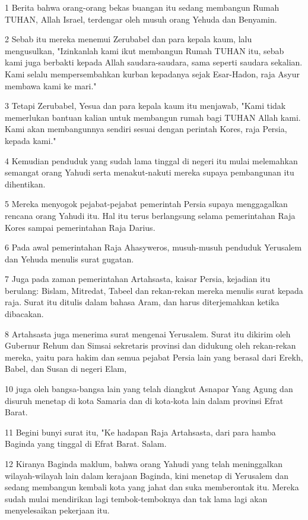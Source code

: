 \par 1 Berita bahwa orang-orang bekas buangan itu sedang membangun Rumah TUHAN, Allah Israel, terdengar oleh musuh orang Yehuda dan Benyamin.
\par 2 Sebab itu mereka menemui Zerubabel dan para kepala kaum, lalu mengusulkan, "Izinkanlah kami ikut membangun Rumah TUHAN itu, sebab kami juga berbakti kepada Allah saudara-saudara, sama seperti saudara sekalian. Kami selalu mempersembahkan kurban kepadanya sejak Esar-Hadon, raja Asyur membawa kami ke mari."
\par 3 Tetapi Zerubabel, Yesua dan para kepala kaum itu menjawab, "Kami tidak memerlukan bantuan kalian untuk membangun rumah bagi TUHAN Allah kami. Kami akan membangunnya sendiri sesuai dengan perintah Kores, raja Persia, kepada kami."
\par 4 Kemudian penduduk yang sudah lama tinggal di negeri itu mulai melemahkan semangat orang Yahudi serta menakut-nakuti mereka supaya pembangunan itu dihentikan.
\par 5 Mereka menyogok pejabat-pejabat pemerintah Persia supaya menggagalkan rencana orang Yahudi itu. Hal itu terus berlangsung selama pemerintahan Raja Kores sampai pemerintahan Raja Darius.
\par 6 Pada awal pemerintahan Raja Ahasyweros, musuh-musuh penduduk Yerusalem dan Yehuda menulis surat gugatan.
\par 7 Juga pada zaman pemerintahan Artahsasta, kaisar Persia, kejadian itu berulang: Bislam, Mitredat, Tabeel dan rekan-rekan mereka menulis surat kepada raja. Surat itu ditulis dalam bahasa Aram, dan harus diterjemahkan ketika dibacakan.
\par 8 Artahsasta juga menerima surat mengenai Yerusalem. Surat itu dikirim oleh Gubernur Rehum dan Simsai sekretaris provinsi dan didukung oleh rekan-rekan mereka, yaitu para hakim dan semua pejabat Persia lain yang berasal dari Erekh, Babel, dan Susan di negeri Elam,
\par 10 juga oleh bangsa-bangsa lain yang telah diangkut Asnapar Yang Agung dan disuruh menetap di kota Samaria dan di kota-kota lain dalam provinsi Efrat Barat.
\par 11 Begini bunyi surat itu, "Ke hadapan Raja Artahsasta, dari para hamba Baginda yang tinggal di Efrat Barat. Salam.
\par 12 Kiranya Baginda maklum, bahwa orang Yahudi yang telah meninggalkan wilayah-wilayah lain dalam kerajaan Baginda, kini menetap di Yerusalem dan sedang membangun kembali kota yang jahat dan suka memberontak itu. Mereka sudah mulai mendirikan lagi tembok-temboknya dan tak lama lagi akan menyelesaikan pekerjaan itu.
